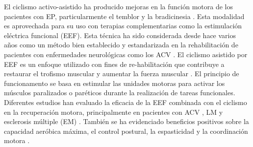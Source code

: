 El ciclismo activo-asistido ha producido mejoras en la función motora de los pacientes con EP, particularmente el temblor y la bradicinesia \cite{ryan2020interval, palomino2021efectividad}. Esta modalidad es aprovechada para su uso con terapias complementarias como la estimulación eléctrica funcional (EEF). Esta técnica ha sido considerada desde hace varios años como un método bien establecido y estandarizada en la rehabilitación de pacientes con enfermedades neurológicas como los ACV \cite{rabelo2018overview}. El ciclismo asistido por EEF es un enfoque utilizado con fines de re-habilitación que contribuye a restaurar el trofismo muscular y aumentar la fuerza muscular \cite{barbosa2015application, ferrante2008cycling}. El principio de funcionamento se basa en estimular las unidades motoras para activar los músculos paralizados o paréticos durante la realización de tareas funcionales. Diferentes estudios han evaluado la eficacia de la EEF combinada con el ciclismo en la recuperación motora, principalmente en pacientes con ACV \cite{ambrosini2020does}, LM \cite{casabona2020effects} y esclerosis múltiple (EM) \cite{pilutti2019functional}. También se ha evidenciado beneficios positivos sobre la capacidad aeróbica máxima, el control postural, la espasticidad y la coordinación motora \cite{barbosa2015application, rabelo2018overview}.